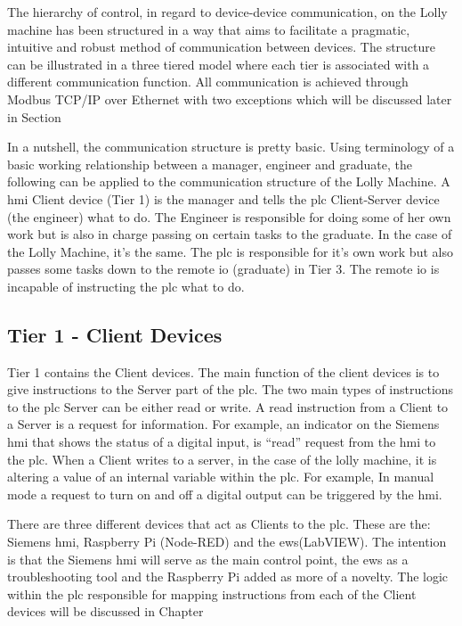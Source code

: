        The hierarchy of control, in regard to device-device communication, on the Lolly machine has been structured in a way that aims to facilitate a pragmatic, intuitive and robust method of communication between devices. The structure can be illustrated in a three tiered model where each tier is associated with a different communication function. All communication is achieved through Modbus TCP/IP over Ethernet with two exceptions which will be discussed later in Section 

        In a nutshell, the communication structure is pretty basic. Using terminology of a basic working relationship between a manager,  engineer and graduate,  the following can be applied to the communication structure of the Lolly Machine. A \acrshort{hmi} Client device (Tier 1) is the manager and tells the \acrshort{plc} Client-Server device (the engineer) what to do. The Engineer is responsible for doing some of her own work but is also in charge passing on certain tasks to the graduate. In the case of the Lolly Machine, it’s the same. The \acrshort{plc} is responsible for it’s own work but also passes some tasks down to the remote \acrshort{io} (graduate) in Tier 3. The remote \acrshort{io} is incapable of instructing the \acrshort{plc} what to do. 

        \subsection{Tier 1 - Client Devices}

        Tier 1 contains the Client devices. The main function of the client devices is to give instructions to the Server part of the \acrshort{plc}. The two main types of instructions to the \acrshort{plc} Server can be either read or write. A read instruction from a Client to a Server is a request for information. For example, an indicator on the Siemens \acrshort{hmi} that shows the status of a digital input, is “read” request from the \acrshort{hmi} to the \acrshort{plc}. When a Client writes to a server, in the case of the lolly machine, it is altering a value of an internal variable within the \acrshort{plc}. For example, In manual mode a request to turn on and off a digital output can be triggered by the \acrshort{hmi}.

        There are three different devices that act as Clients to the \acrshort{plc}. These are the: Siemens \acrshort{hmi}, Raspberry Pi (Node-RED) and the \acrshort{ews}(LabVIEW). The intention is that the Siemens \acrshort{hmi} will serve as the main control point, the \acrshort{ews} as a troubleshooting tool and the Raspberry Pi added as more of a novelty. The logic within the \acrshort{plc} responsible for mapping instructions from each of the Client devices will be discussed in Chapter 

